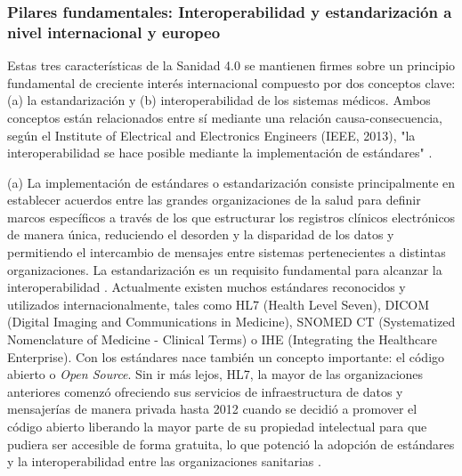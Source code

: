 \subsubsection{Pilares fundamentales: Interoperabilidad y estandarización a nivel internacional y europeo}

Estas tres características de la Sanidad 4.0 se mantienen firmes sobre un principio fundamental de creciente interés internacional compuesto por dos conceptos clave: (a) la estandarización y (b) interoperabilidad de los sistemas médicos. Ambos conceptos están relacionados entre sí mediante una relación causa-consecuencia, según el Institute of Electrical and Electronics Engineers (IEEE, 2013), "la interoperabilidad se hace posible mediante la implementación de estándares" \cite{berryman2013data}.

(a) La implementación de estándares o estandarización consiste principalmente en establecer acuerdos entre las grandes organizaciones de la salud para definir marcos específicos a través de los que estructurar los registros clínicos electrónicos de manera única, reduciendo el desorden y la disparidad de los datos y permitiendo el intercambio de mensajes entre sistemas pertenecientes a distintas organizaciones. La estandarización es un requisito fundamental para alcanzar la interoperabilidad \cite{katehakis2019framework}. Actualmente existen muchos estándares reconocidos y utilizados internacionalmente, tales como HL7 (Health Level Seven), DICOM (Digital Imaging and Communications in Medicine), SNOMED CT (Systematized Nomenclature of Medicine - Clinical Terms) o IHE (Integrating the Healthcare Enterprise). Con los estándares nace también un concepto importante: el código abierto o \textit{Open Source}. Sin ir más lejos, HL7, la mayor de las organizaciones anteriores comenzó ofreciendo sus servicios de infraestructura de datos y mensajerías de manera privada hasta 2012 cuando se decidió a promover el código abierto liberando la mayor parte de su propiedad intelectual para que pudiera ser accesible de forma gratuita, lo que potenció la adopción de estándares y la interoperabilidad entre las organizaciones sanitarias \cite{berryman2013data}.

